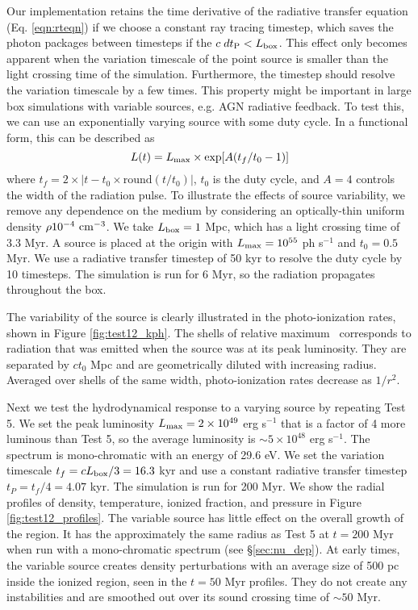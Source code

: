 \documentclass[apj,onecolumn]{emulateapj}
\begin{document}
Our implementation retains the time derivative of the radiative
transfer equation (Eq. \ref{eqn:rteqn}) if we choose a constant ray
tracing timestep, which saves the photon packages between timesteps if
the $c\;dt_{\rm P} < L_{\rm box}$.  This effect only becomes apparent
when the variation timescale of the point source is smaller than the
light crossing time of the simulation.  Furthermore, the timestep
should resolve the variation timescale by a few times.  This property
might be important in large box simulations with variable sources,
e.g. AGN radiative feedback.  To test this, we can use an
exponentially varying source with some duty cycle.  In a functional
form, this can be described as
%
\begin{equation}
  \label{eqn:test12}
  L(t) = L_{\rm max} \times \exp[A(t_f/t_0 - 1)]
\end{equation}
%
where $t_f = 2 \times |t - t_0 \times \mathrm{round}(t/t_0)|$, $t_0$
is the duty cycle, and $A=4$ controls the width of the radiation
pulse.  To illustrate the effects of source variability, we remove any
dependence on the medium by considering an optically-thin uniform
density $\rho 10^{-4}~\cubecm$.  We take $L_{\rm box} = 1$ Mpc, which
has a light crossing time of 3.3 Myr.  A source is placed at the
origin with $L_{\rm max} = 10^{55}$ ph s$^{-1}$ and $t_0 = 0.5$ Myr.
We use a radiative transfer timestep of 50 kyr to resolve the duty
cycle by 10 timesteps.  The simulation is run for 6 Myr, so the
radiation propagates throughout the box.

The variability of the source is clearly illustrated in the
photo-ionization rates, shown in Figure \ref{fig:test12_kph}.  The
shells of relative maximum \kph~corresponds to radiation that was
emitted when the source was at its peak luminosity.  They are
separated by $ct_0$ Mpc and are geometrically diluted with increasing
radius.  Averaged over shells of the same width, photo-ionization
rates decrease as $1/r^2$.

Next we test the hydrodynamical response to a varying source by
repeating Test 5.  We set the peak luminosity $L_{\rm max} = 2 \times
10^{49}$ erg s$^{-1}$ that is a factor of 4 more luminous than Test 5,
so the average luminosity is $\sim 5 \times 10^{48}$ erg s$^{-1}$.
The spectrum is mono-chromatic with an energy of 29.6 eV.  We set the
variation timescale $t_f = cL_{\rm box}/3 = 16.3$ kyr and use a
constant radiative transfer timestep $t_P = t_f/4 = 4.07$ kyr.  The
simulation is run for 200 Myr.  We show the radial profiles of
density, temperature, ionized fraction, and pressure in Figure
\ref{fig:test12_profiles}.  The variable source has little effect on
the overall growth of the  region.  It has the approximately
the same radius as Test 5 at $t = 200$ Myr when run with a
mono-chromatic spectrum (see \S\ref{sec:nu_dep}).  At early times, the
variable source creates density perturbations with an average size of
500 pc inside the ionized region, seen in the $t = 50$ Myr profiles.
They do not create any instabilities and are smoothed out over its
sound crossing time of $\sim 50$ Myr.
\end{document}
